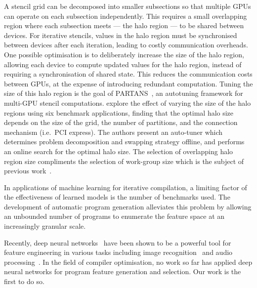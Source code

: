 A stencil grid can be decomposed into smaller subsections so that multiple GPUs can operate on each subsection independently. This requires a small overlapping region where each subsection meets --- the halo region --- to be shared between devices. For iterative stencils, values in the halo region must be synchronised between devices after each iteration, leading to costly communication overheads. One possible optimisation is to deliberately increase the size of the halo region, allowing each device to compute updated values for the halo region, instead of requiring a synchronisation of shared state. This reduces the communication costs between GPUs, at the expense of introducing redundant computation. Tuning the size of this halo region is the goal of PARTANS~\cite{Lutz2013}, an autotuning framework for multi-GPU stencil computations. \citeauthor{Lutz2013} explore the effect of varying the size of the halo regions using six benchmark applications, finding that the optimal halo size depends on the size of the grid, the number of partitions, and the connection mechanism (i.e.\ PCI express). The authors present an auto-tuner which determines problem decomposition and swapping strategy offline, and performs an online search for the optimal halo size. The selection of overlapping halo region size compliments the selection of work-group size which is the subject of previous work~\cite{Cummins2015}.

In applications of machine learning for iterative compilation, a limiting factor of the effectiveness of learned models is the number of benchmarks used. The development of automatic program generation alleviates this problem by allowing an unbounded number of programs to enumerate the feature space at an increasingly granular scale.



Recently, deep neural networks~\cite{LeCun2015} have been shown to be a powerful tool for feature engineering in various tasks including image recognition~\cite{Krizhevsky2012,He2016} and audio processing~\cite{Lee2009b}. In the field of compiler optimisation, no work so far has applied deep neural networks for program feature generation and selection. Our work is the first to do so.


